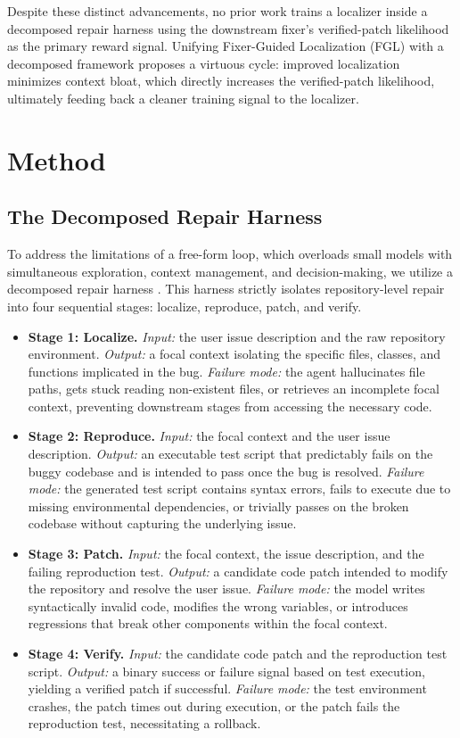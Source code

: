 \documentclass[11pt,a4paper]{article}
\begin{document}
Despite these distinct advancements, no prior work trains a localizer inside a decomposed repair harness using the downstream fixer's verified-patch likelihood as the primary reward signal. Unifying Fixer-Guided Localization (FGL) with a decomposed framework proposes a virtuous cycle: improved localization minimizes context bloat, which directly increases the verified-patch likelihood, ultimately feeding back a cleaner training signal to the localizer.

\section{Method}

\subsection{The Decomposed Repair Harness}
To address the limitations of a free-form loop, which overloads small models with simultaneous exploration, context management, and decision-making, we utilize a decomposed repair harness \cite{LOOP}. This harness strictly isolates repository-level repair into four sequential stages: localize, reproduce, patch, and verify.

\begin{itemize}[leftmargin=*, topsep=4pt, itemsep=4pt]
    \item \textbf{Stage 1: Localize.} \emph{Input:} the user issue description and the raw repository environment. \emph{Output:} a focal context isolating the specific files, classes, and functions implicated in the bug. \emph{Failure mode:} the agent hallucinates file paths, gets stuck reading non-existent files, or retrieves an incomplete focal context, preventing downstream stages from accessing the necessary code.
    \item \textbf{Stage 2: Reproduce.} \emph{Input:} the focal context and the user issue description. \emph{Output:} an executable test script that predictably fails on the buggy codebase and is intended to pass once the bug is resolved. \emph{Failure mode:} the generated test script contains syntax errors, fails to execute due to missing environmental dependencies, or trivially passes on the broken codebase without capturing the underlying issue.
    \item \textbf{Stage 3: Patch.} \emph{Input:} the focal context, the issue description, and the failing reproduction test. \emph{Output:} a candidate code patch intended to modify the repository and resolve the user issue. \emph{Failure mode:} the model writes syntactically invalid code, modifies the wrong variables, or introduces regressions that break other components within the focal context.
    \item \textbf{Stage 4: Verify.} \emph{Input:} the candidate code patch and the reproduction test script. \emph{Output:} a binary success or failure signal based on test execution, yielding a verified patch if successful. \emph{Failure mode:} the test environment crashes, the patch times out during execution, or the patch fails the reproduction test, necessitating a rollback.
\end{itemize}
\end{document}
